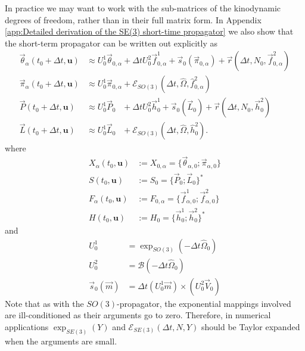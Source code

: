 In practice we may want to work with the sub-matrices of the kinodynamic degrees of freedom, rather than in their full matrix form. In Appendix \ref{app:Detailed derivation of the SE(3) short-time propagator} we also show that the short-term propagator can be written out explicitly as
\begin{subequations}
	\begin{align}
	\vec{\theta}_\alpha(t_0 + \Delta t, \mathbf{u}) & \approx U_0^1 \vec{\theta}_{0,\alpha} + \Delta t U_0^2 \vec{f}_{0,\alpha}^1 + \vec{s}_0(\vec{\pi}_{0,\alpha}) + \vec{r}(\Delta t, N_0, \vec{f}_{0,\alpha}^2) \\
	\vec{\pi}_\alpha(t_0 + \Delta t, \mathbf{u}) & \approx U_0^1 \vec{\pi}_{0,\alpha} + \mathscr{E}_{SO(3)}(\Delta t, \hat{\Omega}, \hat{f}_{0,\alpha}^2) \\
	\vec{P}(t_0 + \Delta t, \mathbf{u}) & \approx U_0^1 \vec{P}_{0\phantom{,\alpha}} + \Delta t U_0^2 \vec{h}_0^1 + \vec{s}_0(\vec{L}_0) + \vec{r}(\Delta t, N_0, \vec{h}_0^2) \\
	\vec{L}(t_0 + \Delta t, \mathbf{u}) & \approx U_0^1 \vec{L}_{0\phantom{,\alpha}} + \mathscr{E}_{SO(3)}(\Delta t, \hat{\Omega}, \hat{h}_0^2).
	\end{align}
\end{subequations} 
where
\begin{subequations}
	\begin{align}
		X_\alpha(t_0, \mathbf{u}) & := X_{0,\alpha} = \{ \vec{\theta}_{\alpha,0} ; \vec{\pi}_{\alpha,0} \} \\
		S(t_0, \mathbf{u}) & := S_0 = \{ \vec{P}_0 ; \vec{L}_0 \}^* \\
		F_\alpha(t_0, \mathbf{u}) & := F_{0,\alpha} = \{ \vec{f}^1_{\alpha,0} ; \vec{f}^2_{\alpha,0} \} \\
		H(t_0, \mathbf{u}) & := H_0 = \{ \vec{h}^1_0 ; \vec{h}^2_0 \}^*
	\end{align}
\end{subequations}
and
\begin{subequations}
	\begin{align}
		U^1_0 & = \exp_{SO(3)}(-\Delta t \hat{\Omega}_0) \\
		U^2_0 & = \mathscr{B}(- \Delta t \hat{\Omega}_0) \\
		\vec{s}_0(\vec{m}) & = \Delta t (U^1_0 \vec{m}) \times \left( U_0^2 \vec{V}_0 \right)
	\end{align}
\end{subequations}
Note that as with the $SO(3)$-propagator, the exponential mappings involved are ill-conditioned as their arguments go to zero. Therefore, in numerical applications $\exp_{SE(3)}(Y)$ and $\mathscr{E}_{SE(3)}(\Delta t, N, Y)$ should be Taylor expanded when the arguments are small.

